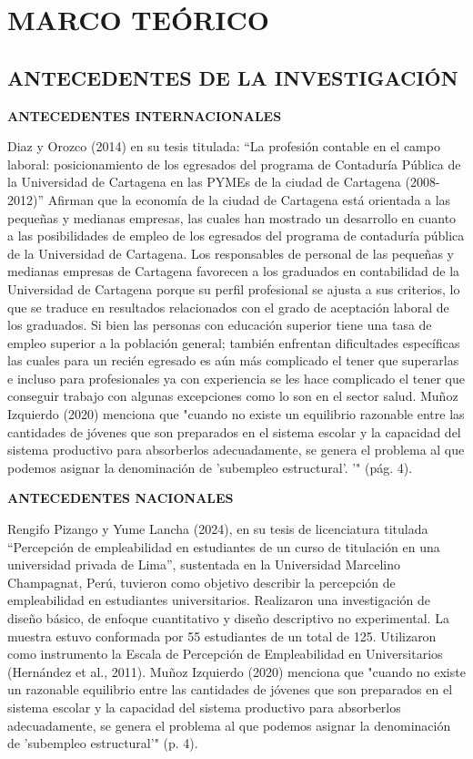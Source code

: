 \documentclass[12pt, a4paper]{article}
\begin{document}
\section{MARCO TEÓRICO}
\subsection{ANTECEDENTES  DE LA INVESTIGACIÓN}

\textbf{ANTECEDENTES INTERNACIONALES}

Diaz y Orozco (2014) en su tesis titulada: “La profesión contable en el campo laboral: posicionamiento de los egresados del programa de Contaduría Pública de la Universidad de Cartagena en las PYMEs de la ciudad de Cartagena (2008- 2012)” Afirman que la economía de la ciudad de Cartagena está orientada a las pequeñas y medianas empresas, las cuales han mostrado un desarrollo en cuanto a las posibilidades de empleo de los egresados del programa de contaduría pública de la Universidad de Cartagena. Los responsables de personal de las pequeñas y medianas empresas de Cartagena favorecen a los graduados en contabilidad de la Universidad de Cartagena porque su perfil profesional se ajusta a sus criterios, lo que se traduce en resultados relacionados con el grado de aceptación laboral de los graduados.
Si bien las personas con educación superior tiene una tasa de empleo superior a la población general; también enfrentan dificultades específicas las cuales para un recién egresado es aún más complicado el tener que superarlas e incluso para profesionales ya con experiencia se les hace complicado el tener que conseguir trabajo con algunas excepciones como lo son en el sector salud. Muñoz Izquierdo (2020) menciona que "cuando no existe un equilibrio razonable entre las cantidades de jóvenes que son preparados en el sistema escolar y la capacidad del sistema productivo para absorberlos adecuadamente, se genera el problema al que podemos asignar la denominación de 'subempleo estructural'. '" (pág. 4).

\textbf{ANTECEDENTES NACIONALES}

Rengifo Pizango y Yume Lancha (2024), en su tesis de licenciatura titulada “Percepción de empleabilidad en estudiantes de un curso de titulación en una universidad privada de Lima”, sustentada en la Universidad Marcelino Champagnat, Perú, tuvieron como objetivo describir la percepción de empleabilidad en estudiantes universitarios. Realizaron una investigación de diseño básico, de enfoque cuantitativo y diseño descriptivo no experimental. La muestra estuvo conformada por 55 estudiantes de un total de 125. Utilizaron como instrumento la Escala de Percepción de Empleabilidad en Universitarios (Hernández et al., 2011).
Muñoz Izquierdo (2020) menciona que "cuando no existe un razonable equilibrio entre las cantidades de jóvenes que son preparados en el sistema escolar y la capacidad del sistema productivo para absorberlos adecuadamente, se genera el problema al que podemos asignar la denominación de 'subempleo estructural'" (p. 4).
\end{document}
